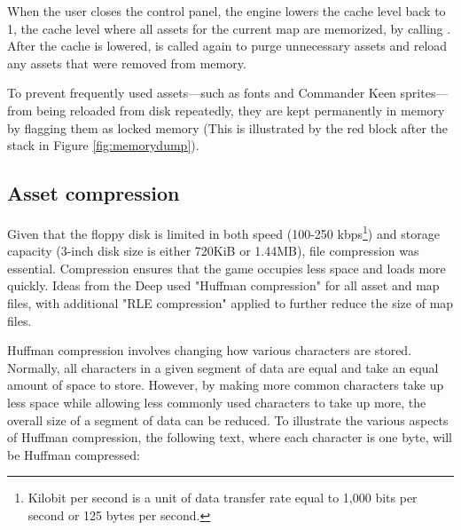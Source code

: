 \documentclass[book.tex]{subfiles}
\begin{document}
\par
When the user closes the control panel, the engine lowers the cache level back to 1, the cache level where all assets for the current map are memorized, by calling . After the cache is lowered,  is called again to purge unnecessary assets and reload any assets that were removed from memory.\\

\par


\par
To prevent frequently used assets---such as fonts and Commander Keen sprites---from being reloaded from disk repeatedly, they are kept permanently in memory by flagging them as locked memory (This is illustrated by the red block after the stack in Figure \ref{fig:memorydump}). \\

\par

\par
 
\subsection{Asset compression}
Given that the floppy disk is limited in both speed (100-250 kbps\footnote{Kilobit per second is a unit of data transfer rate equal to 1,000 bits per second or 125 bytes per second.}) and storage capacity (3-inch disk size is either 720KiB or 1.44MB), file compression was essential. Compression ensures that the game occupies less space and loads more quickly. Ideas from the Deep used "Huffman compression" for all asset and map files, with additional "RLE compression" applied to further reduce the size of map files.\\


\par
Huffman compression involves changing how various characters are stored. Normally, all characters in a given segment of data are equal and take an equal amount of space to store. However, by making more common characters take up less space while allowing less commonly used characters to take up more, the overall size of a segment of data can be reduced. To illustrate the various aspects of Huffman compression, the following text, where each character is one byte, will be Huffman compressed: \\
\end{document}
